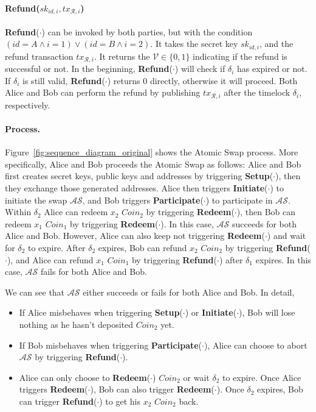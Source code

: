 \paragraph{\textbf{Refund}($sk_{id, i}, tx_{\mathcal{R}, i}$)}
\textbf{Refund}($\cdot$) can be invoked by both parties, but with the condition $(id = A \wedge i = 1) \vee (id = B \wedge i = 2)$.
It takes the secret key $sk_{id, i}$,
and the refund transaction $tx_{\mathcal{R}, i}$.
It returns the $\mathcal{V} \in \{0, 1\}$ indicating if the refund is successful or not.
In the beginning, \textbf{Refund}($\cdot$) will check if $\delta_i$ has expired or not. If $\delta_i$ is still valid, \textbf{Refund}($\cdot$) returns $0$ directly, otherwise it will proceed.
Both Alice and Bob can perform the refund by publishing $tx_{\mathcal{R}, i}$ after the timelock $\delta_i$, respectively.

\paragraph{Process.}
Figure~\ref{fig:sequence_diagram_original} shows the Atomic Swap process.
More specifically, Alice and Bob proceeds the Atomic Swap as follows:
Alice and Bob first creates secret keys, public keys and addresses by triggering \textbf{Setup}($\cdot$), then they exchange those generated addresses.
Alice then triggers \textbf{Initiate}($\cdot$) to initiate the swap $\mathcal{AS}$, and Bob triggers \textbf{Participate}($\cdot$) to participate in $\mathcal{AS}$.
Within $\delta_2$ Alice can redeem $x_2$ $Coin_2$ by triggering \textbf{Redeem}($\cdot$), then Bob can redeem $x_1$ $Coin_1$ by triggering \textbf{Redeem}($\cdot$).
In this case, $\mathcal{AS}$ succeeds for both Alice and Bob.
However, Alice can also keep not triggering \textbf{Redeem}($\cdot$) and wait for $\delta_2$ to expire.
After $\delta_2$ expires, Bob can refund $x_2$ $Coin_2$ by triggering \textbf{Refund}($\cdot$), and Alice can refund $x_1$ $Coin_1$ by triggering \textbf{Refund}($\cdot$) after $\delta_1$ expires.
In this case, $\mathcal{AS}$ fails for both Alice and Bob.

We can see that $\mathcal{AS}$ either succeeds or fails for both Alice and Bob.
In detail,

\begin{itemize}
    \item If Alice misbehaves when triggering \textbf{Setup}($\cdot$) or \textbf{Initiate}($\cdot$), Bob will lose nothing as he hasn't deposited $Coin_2$ yet.
    \item If Bob misbehaves when triggering \textbf{Participate}($\cdot$), Alice can choose to abort $\mathcal{AS}$ by triggering \textbf{Refund}($\cdot$).
    \item Alice can only choose to \textbf{Redeem}($\cdot$) $Coin_2$ or wait $\delta_2$ to expire.
    Once Alice triggers \textbf{Redeem}($\cdot$), Bob can also trigger \textbf{Redeem}($\cdot$).
    Once $\delta_2$ expires, Bob can trigger \textbf{Refund}($\cdot$) to get his $x_2$ $Coin_2$ back.
\end{itemize}

